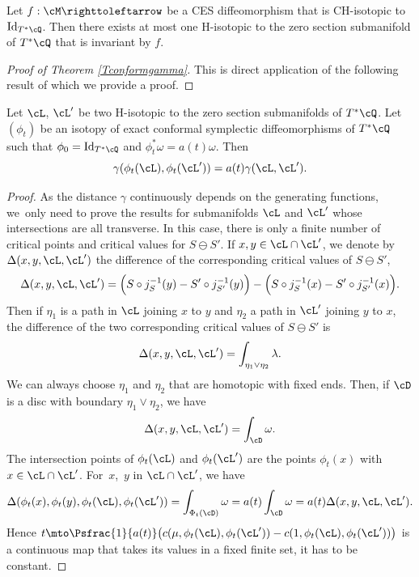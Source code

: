 \begin{corollary}\label{Cunicityinavariant}
Let $f:\cM \righttoleftarrow$ be a CES diffeomorphism that is CH-isotopic to ${\rm Id}_{T^*\cQ}$. Then there exists at most one H-isotopic to the zero section submanifold of $T^*\cQ$ that is invariant by $f$.
\end{corollary}

\begin{proof}[Proof of Theorem \ref{Tconformgamma}]
This is direct application of the following result of which we provide a proof.
\end{proof}

\begin{lemma}\label{Lconformgamma}
Let $\cL$, $\cL'$ be two H-isotopic to the zero section submanifolds of $T^*\cQ$. Let~$(\phi_t)$ be an isotopy of exact conformal symplectic diffeomorphisms of $T^*\cQ$ such that $\phi_0={\rm Id}_{T^*\cQ}$ and $\phi_t^*\omega=a(t)\omega$. Then
\[
\gamma(\phi_t(\cL), \phi_t(\cL'))=a(t)\gamma(\cL, \cL').
\]
\end{lemma}

\begin{proof} As the distance $\gamma$ continuously depends on the generating functions, we~only need to prove the results for submanifolds $\cL$ and $\cL'$ whose intersections are all transverse. In this case, there is only a finite number of critical points and critical values for $S\ominus S'$. If $x, y\in\cL\cap\cL'$, we denote by $\Delta(x, y, \cL, \cL')$ the difference of the corresponding critical values of $S\ominus S'$, \ie
\[
\Delta(x, y, \cL, \cL')=\Big(S\circ j_S^{-1}(y)-S'\circ j_{S'}^{-1}(y)\Big)-\Big(S\circ j_S^{-1}(x)-S'\circ j_{S'}^{-1}(x)\Big).
\]
Then if $\eta_1$ is a path in $\cL$ joining $x$ to $y$ and $\eta_2$ a path in $\cL'$ joining $y$ to $x$, the difference of the two corresponding critical values of $S\ominus S'$ is
\[
\Delta(x, y, \cL, \cL')=\int_{\eta_1\vee\eta_2}\lambda.
\]
We can always choose $\eta_1$ and $\eta_2$ that are homotopic with fixed ends. Then, if $\cD$ is a disc with boundary $\eta_1\vee\eta_2$, we have
\[
\Delta(x, y, \cL, \cL')=\int_{\cD}\omega.
\]
The intersection points of $\phi_t(\cL)$ and $\phi_t(\cL')$ are the points $\phi_t(x)$ with $x\in\cL\cap \cL'$. For~$x$,~$y$ in $\cL\cap\cL'$, we have
\[
\Delta(\phi_t(x), \phi_t(y), \phi_t(\cL), \phi_t(\cL'))=\int_{\Phi_t(\cD)}\omega=a(t)\int_\cD\omega=a(t)\Delta(x, y, \cL, \cL').
\]
Hence $t\mto \Psfrac{1}{a(t)}\big(c(\mu, \phi_t(\cL), \phi_t(\cL'))-c(1, \phi_t(\cL), \phi_t(\cL'))\big)$ is a continuous map that takes its values in a fixed finite set, it has to be constant.
\end{proof}

